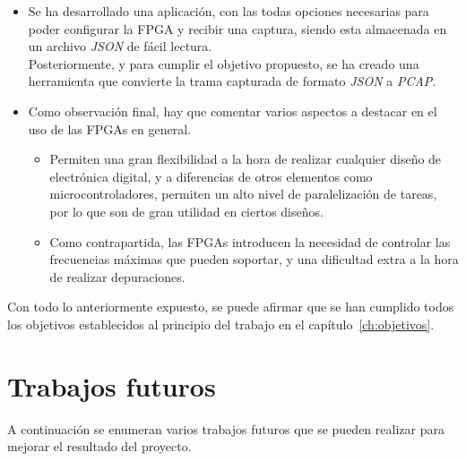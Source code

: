 \begin{itemize}
    \item Se ha desarrollado una aplicación, con las todas opciones necesarias para poder configurar la FPGA y recibir una captura, siendo esta almacenada en un archivo \emph{JSON} de fácil lectura. \\
    Posteriormente, y para cumplir el objetivo propuesto, se ha creado una herramienta que convierte la trama capturada de formato \emph{JSON} a \emph{PCAP}.
    
    \item Como observación final, hay que comentar varios aspectos a destacar en el uso de las FPGAs en general.
    \begin{itemize}
        \item Permiten una gran flexibilidad a la hora de realizar cualquier diseño de electrónica digital, y a diferencias de otros elementos como microcontroladores, permiten un alto nivel de paralelización de tareas, por lo que son de gran utilidad en ciertos diseños.
        
        \item Como contrapartida, las FPGAs introducen la necesidad de controlar las frecuencias máximas que pueden soportar, y una dificultad extra a la hora de realizar depuraciones.
    \end{itemize}
\end{itemize}

Con todo lo anteriormente expuesto, se puede afirmar que se han cumplido todos los objetivos establecidos al principio del trabajo en el capítulo~\ref{ch:objetivos}.



\section{Trabajos futuros}
A continuación se enumeran varios trabajos futuros que se pueden realizar para mejorar el resultado del proyecto.

